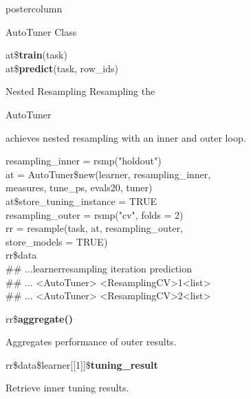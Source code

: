 \documentclass{beamer}
\newcommand{\codeinline}[1]{\begin{codeboxinline}#1\end{codeboxinline}}
\newcommand{\monospace}[1]{\multido{}{#1}{\space}}
\begin{document}
\begin{frame}[fragile]{}
\begin{columns}
\begin{column}{.245\textwidth}
\begin{beamercolorbox}[center]{postercolumn}
\begin{minipage}{.98\textwidth}
{\begin{myblock}{AutoTuner Class}
							\begin{codeboxmultiline}[width=16.5cm]
								at\$\textbf{train}(task)\\
								at\$\textbf{predict}(task, row\_ids)
							\end{codeboxmultiline}
						\end{myblock}
						\begin{myblock}{Nested Resampling}
							Resampling the \codeinline{AutoTuner} achieves nested resampling 
							with an inner and outer loop. 
							\\
							\begin{codeboxexample}
								{\scriptsize
									resampling\_inner = rsmp("holdout")
									\vspace{1em}
									\\
									at = AutoTuner\$new(learner, resampling\_inner, \\
									\hspace*{1ex}measures, tune\_ps, evals20, tuner) \\
									at\$store\_tuning\_instance = TRUE
									\vspace{1em}
									\\
									resampling\_outer = rsmp("cv", folds = 2)\\
									rr = resample(task, at, resampling\_outer, \\
									\hspace*{1ex}store\_models = TRUE)
									\vspace{1em}
									\\
									rr\$data\\
									\#\# ...\monospace{3}learner\monospace{5}resampling iteration
									prediction\\
									\#\# ... <AutoTuner> <ResamplingCV>\monospace{9}1\monospace{5}<list>\\
									\#\# ... <AutoTuner> <ResamplingCV>\monospace{9}2\monospace{5}<list>}
							\end{codeboxexample}
							\vspace{1em}
							\begin{codebox}
								rr\$\textbf{aggregate()}
							\end{codebox}
							Aggregates performance of outer results.
							\\
							\begin{codebox}
								rr\$data\$learner[[1]]\$\textbf{tuning\_result}
							\end{codebox}
							Retrieve inner tuning results.

\end{myblock}}
\end{minipage}
\end{beamercolorbox}
\end{column}
\end{columns}
\end{frame}
\end{document}
